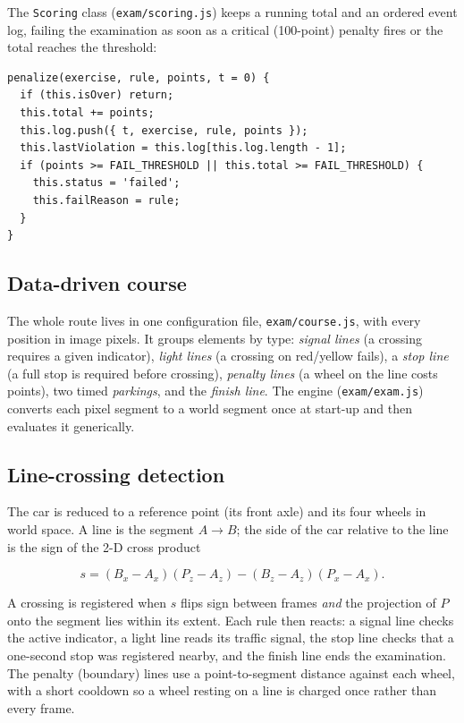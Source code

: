 \documentclass[11pt]{article}
\newcommand{\code}[1]{\texttt{#1}}
\begin{document}
The \code{Scoring} class (\code{exam/scoring.js}) keeps a running total and an
ordered event log, failing the examination as soon as a critical (100-point)
penalty fires or the total reaches the threshold:

\begin{lstlisting}[caption={Penalty accumulation (\code{scoring.js}).}]
penalize(exercise, rule, points, t = 0) {
  if (this.isOver) return;
  this.total += points;
  this.log.push({ t, exercise, rule, points });
  this.lastViolation = this.log[this.log.length - 1];
  if (points >= FAIL_THRESHOLD || this.total >= FAIL_THRESHOLD) {
    this.status = 'failed';
    this.failReason = rule;
  }
}
\end{lstlisting}

\subsection{Data-driven course}

The whole route lives in one configuration file, \code{exam/course.js}, with
every position in image pixels. It groups elements by type: \emph{signal lines}
(a crossing requires a given indicator), \emph{light lines} (a crossing on
red/yellow fails), a \emph{stop line} (a full stop is required before
crossing), \emph{penalty lines} (a wheel on the line costs points), two timed
\emph{parkings}, and the \emph{finish line}. The engine (\code{exam/exam.js})
converts each pixel segment to a world segment once at start-up and then
evaluates it generically.

\subsection{Line-crossing detection}

The car is reduced to a reference point (its front axle) and its four wheels in
world space. A line is the segment $A\!\to\!B$; the side of the car relative to
the line is the sign of the 2-D cross product

\[
  s = (B_x - A_x)(P_z - A_z) - (B_z - A_z)(P_x - A_x).
\]

A crossing is registered when $s$ flips sign between frames \emph{and} the
projection of $P$ onto the segment lies within its extent. Each rule then
reacts: a signal line checks the active indicator, a light line reads its
traffic signal, the stop line checks that a one-second stop was registered
nearby, and the finish line ends the examination. The penalty (boundary) lines
use a point-to-segment distance against each wheel, with a short cooldown so a
wheel resting on a line is charged once rather than every frame.
\end{document}
